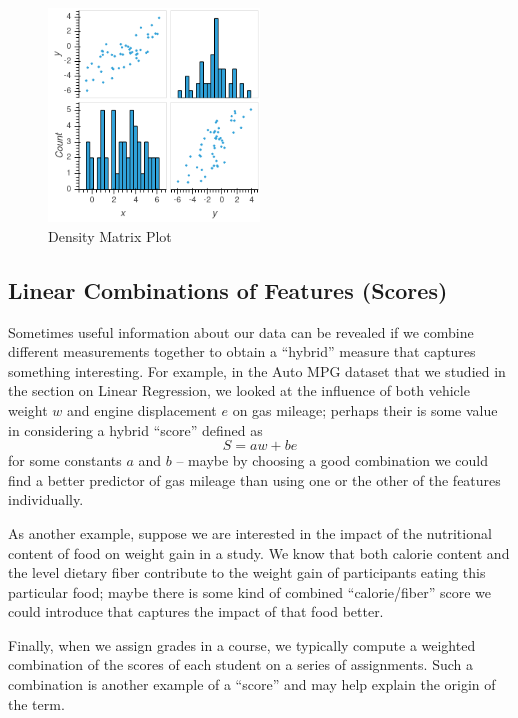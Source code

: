 \documentclass[
  11pt,
  letterpaper,
]{scrbook}
\theoremstyle{plain}
\theoremstyle{plain}
\theoremstyle{remark}
\begin{document}
\begin{figure}

{\centering \includegraphics[width=0.5\textwidth,height=\textheight]{chapters/img/density2x2.png}

}

\caption{\label{fig-density0}Density Matrix Plot}

\end{figure}

\hypertarget{linear-combinations-of-features-scores}{%
\subsection{Linear Combinations of Features
(Scores)}\label{linear-combinations-of-features-scores}}

Sometimes useful information about our data can be revealed if we
combine different measurements together to obtain a ``hybrid'' measure
that captures something interesting. For example, in the Auto MPG
dataset that we studied in the section on Linear Regression, we looked
at the influence of both vehicle weight \(w\) and engine displacement
\(e\) on gas mileage; perhaps their is some value in considering a
hybrid ``score'' defined as \[
S = aw + be
\] for some constants \(a\) and \(b\) -- maybe by choosing a good
combination we could find a better predictor of gas mileage than using
one or the other of the features individually.

As another example, suppose we are interested in the impact of the
nutritional content of food on weight gain in a study. We know that both
calorie content and the level dietary fiber contribute to the weight
gain of participants eating this particular food; maybe there is some
kind of combined ``calorie/fiber'' score we could introduce that
captures the impact of that food better.

Finally, when we assign grades in a course, we typically compute a
weighted combination of the scores of each student on a series of
assignments. Such a combination is another example of a ``score'' and
may help explain the origin of the term.
\end{document}
